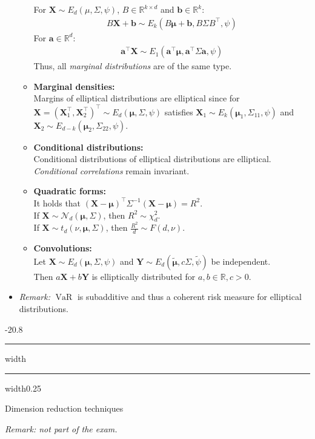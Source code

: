 \documentclass[a4paper,landscape,8pt,fleqn]{scrartcl}
\makeatletter
\renewcommand{\emph}[1]{\textbf{#1}}
\renewcommand{\subsection}{\@startsection{subsection}{1}{0mm}%
{-2\baselineskip}{0.8\baselineskip}%
{\hrule depth 0.2pt width\columnwidth\hrule depth0.75pt
width0.25\columnwidth\vspace*{1.2em}\large\bfseries}}
\DeclareMathOperator{\VaR}{VaR}				%
\makeatother
\begin{document}
\begin{multicols*}{3}
\begin{itemize}
\begin{itemize}
For $\bm X \sim E_d(\mu, \Sigma, \psi)$, $B \in \mathbb{R}^{k \times d}$ and $\bm b \in \mathbb{R}^k$:
\begin{align*}
B \bm X + \bm b \sim E_k(B \bm \mu + \bm b, B \Sigma B^\top, \psi)
\end{align*}
For $\bm a \in \mathbb{R}^d$:
\begin{align*}
\bm a^\top \bm X \sim E_1(\bm a^\top \bm \mu, \bm a^\top \Sigma \bm a, \psi)
\end{align*}
Thus, all \textit{marginal distributions} are of the same type.
\item \emph{Marginal densities:} \\
Margins of elliptical distributions are elliptical since for $\bm X = (\bm X_1^\top, \bm X_2^\top)^\top \sim E_d(\bm \mu, \Sigma, \psi)$ satisfies $\bm X_1 \sim E_k(\bm \mu_1, \Sigma_{11}, \psi)$ and $\bm X_2 \sim E_{d-k}(\bm \mu_2, \Sigma_{22}, \psi)$.
\item \emph{Conditional distributions:} \\
Conditional distributions of elliptical distributions are elliptical. \\
\textit{Conditional correlations} remain invariant.
\item \emph{Quadratic forms:} \\
It holds that $(\bm X - \bm \mu)^\top \Sigma^{-1} (\bm X - \bm \mu) = R^2$. \\
If $\bm X \sim \mathcal{N}_d(\bm \mu, \Sigma)$, then $R^2 \sim \chi_d^2$. \\
If $\bm X \sim t_d(\nu, \bm \mu, \Sigma)$, then $\frac{R^2}{d} \sim F(d, \nu)$.
\item \emph{Convolutions:} \\
Let $\bm X \sim E_d(\bm \mu, \Sigma, \psi)$ and $\bm Y \sim E_d(\tilde{\bm \mu}, c \Sigma, \tilde \psi)$ be independent. \\
Then $a \bm X + b \bm Y$ is elliptically distributed for $a,b \in \mathbb{R}, c > 0$.
\end{itemize}
\item \textit{Remark:} $\VaR$ is subadditive and thus a coherent risk measure for elliptical distributions.
\end{itemize}

\subsection{Dimension reduction techniques}

\textit{Remark: not part of the exam.}


\end{multicols*}
\end{document}
